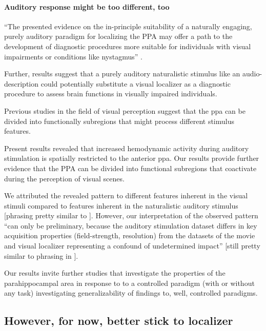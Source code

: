 \paragraph{Auditory response might be too different, too}

%
``The presented evidence on the in-principle suitability of a naturally
engaging, purely auditory paradigm for localizing the PPA may offer a path to
the development of diagnostic procedures more suitable for individuals with
visual impairments or conditions like nystagmus''
\citep{haeusler2022processing}.


Further, results suggest that a purely auditory naturalistic stimulus like an
audio-description could potentially substitute a visual localizer as a
diagnostic procedure to assess brain functions in visually impaired individuals.

Previous studies in the field of visual perception suggest that the \ac{ppa} can
be divided into functionally subregions that might process different stimulus
features.

%
Present results revealed that increased hemodynamic activity during auditory
stimulation is spatially restricted to the anterior \ac{ppa}.
Our results provide further evidence that the PPA can be divided into functional
subregions that coactivate during the perception of visual scenes.

%
We attributed the revealed pattern to different features inherent in the visual
stimuli compared to features inherent in the naturalistic auditory stimulus
[phrasing pretty similar to \citep{haeusler2022processing}].
%
However, our interpretation of the observed pattern ``can only be preliminary,
because the auditory stimulation dataset differs in key acquisition properties
(field-strength, resolution) from the datasets of the movie and visual localizer
representing a confound of undetermined impact'' [still pretty similar to
phrasing in \citep{haeusler2022processing}].

%
Our results invite further studies that investigate the properties of the
parahippocampal area in response to to a controlled paradigm (with or without
any task) investigating generalizability of findings to, well, controlled
paradigms.


\subsection{However, for now, better stick to localizer}

